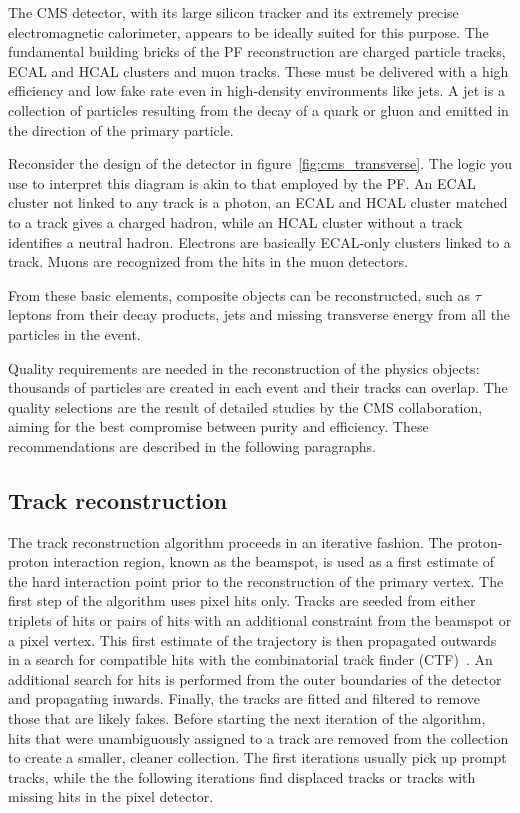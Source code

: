 The CMS detector, with its large silicon tracker and its extremely precise electromagnetic calorimeter, appears to be ideally suited for this purpose. The fundamental building bricks of the PF reconstruction are charged particle tracks, ECAL and HCAL clusters and muon tracks. These must be delivered with a high efficiency and low fake rate even in high-density environments like jets. A jet is a collection of particles resulting from the decay of a quark or gluon and emitted in the direction of the primary particle. 

Reconsider the design of the detector in figure~\ref{fig:cms_transverse}. The logic you use to
interpret this diagram is akin to that employed by the PF.
An ECAL cluster not linked to any track is a photon, an ECAL and HCAL
cluster matched to a track gives a charged hadron, while an HCAL cluster
without a track identifies a neutral hadron. Electrons are basically
ECAL-only clusters linked to a track. Muons are recognized from the hits in
the muon detectors.

From these basic elements, composite objects can be reconstructed, such as
$\tau$ leptons from their decay products, jets and
missing transverse energy from all the particles in the event.

Quality requirements are needed in the reconstruction of the physics
objects: thousands of particles are created in each event and their tracks
can overlap.
The quality selections are the result of detailed studies by the CMS
collaboration, aiming for the best compromise between purity and efficiency.
These recommendations are described in the following paragraphs.

\subsection{Track reconstruction}
The track reconstruction algorithm proceeds in an iterative fashion. The
proton-proton interaction region, known as the beamspot, is used as a first
estimate of the hard interaction point prior to the reconstruction of the
primary vertex.
The first step of the algorithm uses pixel hits only. Tracks are seeded from
either triplets of hits or pairs of hits with an additional constraint from
the beamspot or a pixel vertex. This first estimate of the trajectory is
then propagated outwards in a search for compatible hits with the
combinatorial track finder (CTF)~\cite{ctf}. An additional search for hits
is performed from the outer boundaries of the detector and propagating
inwards. Finally, the tracks are fitted and filtered to remove those that
are likely fakes. Before starting the next iteration of the algorithm, hits
that were unambiguously assigned to a track are removed from the collection
to create a smaller, cleaner collection.
The first iterations usually pick up prompt tracks, while the
the following iterations find displaced tracks or tracks with missing hits
in the pixel detector.

